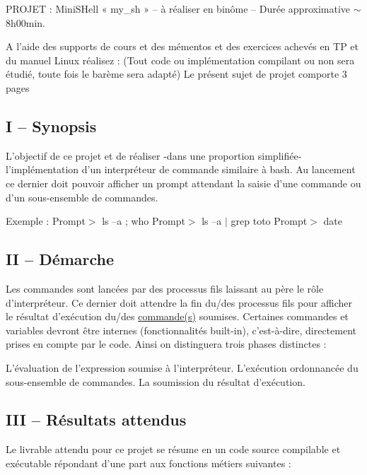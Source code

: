 P\+R\+O\+J\+ET \+: Mini\+S\+Hell « my\+\_\+sh » – à réaliser en binôme – Durée approximative $\sim$ 8h00min.

A l’aide des supports de cours et des mémentos et des exercices achevés en TP et du manuel Linux réalisez \+: (Tout code ou implémentation compilant ou non sera étudié, toute fois le barème sera adapté) Le présent sujet de projet comporte 3 pages

\subsection*{I – Synopsis}

L’objectif de ce projet et de réaliser -\/dans une proportion simplifiée-\/ l’implémentation d’un interpréteur de commande similaire à bash. Au lancement ce dernier doit pouvoir afficher un prompt attendant la saisie d’une commande ou d’un sous-\/ensemble de commandes.

Exemple \+: Prompt$>$ ls –a ; who Prompt$>$ ls –a $\vert$ grep toto Prompt$>$ date

\subsection*{II – Démarche}

Les commandes sont lancées par des processus fils laissant au père le rôle d’interpréteur. Ce dernier doit attendre la fin du/des processus fils pour afficher le résultat d’exécution du/des \hyperlink{structcommande}{commande(s)} soumises. Certaines commandes et variables devront être internes (fonctionnalités built-\/in), c’est-\/à-\/dire, directement prises en compte par le code. Ainsi on distinguera trois phases distinctes \+: \begin{DoxyVerb}L’évaluation de l’expression soumise à l’interpréteur.
L’exécution ordonnancée du sous-ensemble de commandes.
La soumission du résultat d’exécution.
\end{DoxyVerb}


\subsection*{I\+II – Résultats attendus}

Le livrable attendu pour ce projet se résume en un code source compilable et exécutable répondant d’une part aux fonctions métiers suivantes \+:


